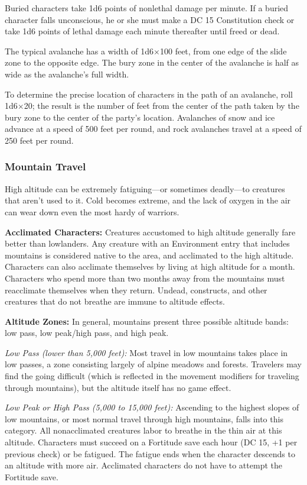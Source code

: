\documentclass{article}
\begin{document}
Buried characters take 1d6 points of nonlethal damage per minute. If a buried character 
falls unconscious, he or she must make a DC 15 Constitution check or take 1d6 points 
of lethal damage each minute thereafter until freed or dead.

The typical avalanche has a width of 1d6\ensuremath{\times}100 feet, from one edge 
of the slide zone to the opposite edge. The bury zone in the center of the avalanche 
is half as wide as the avalanche's full width.

To determine the precise location of characters in the path of an avalanche, roll 
1d6\ensuremath{\times}20; the result is the number of feet from the center of the 
path taken by the bury zone to the center of the party's location. Avalanches of 
snow and ice advance at a speed of 500 feet per round, and rock avalanches travel 
at a speed of 250 feet per round.

\subsubsection*{\textbf{Mountain Travel}}

High altitude can be extremely fatiguing---or sometimes deadly---to creatures that 
aren't used to it. Cold becomes extreme, and the lack of oxygen in the air can 
wear down even the most hardy of warriors.

\textbf{Acclimated Characters:} Creatures accustomed to high altitude generally 
fare better than lowlanders. Any creature with an Environment entry that includes 
mountains is considered native to the area, and acclimated to the high altitude. 
Characters can also acclimate themselves by living at high altitude for a month. 
Characters who spend more than two months away from the mountains must reacclimate 
themselves when they return. Undead, constructs, and other creatures that do not 
breathe are immune to altitude effects.

\textbf{Altitude Zones: }In general, mountains present three possible altitude 
bands: low pass, low peak/high pass, and high peak. 

\textit{Low Pass (lower than 5,000 feet): }Most travel in low mountains takes place 
in low passes, a zone consisting largely of alpine meadows and forests. Travelers 
may find the going difficult (which is reflected in the movement modifiers for 
traveling through mountains), but the altitude itself has no game effect.

\textit{Low Peak or High Pass (5,000 to 15,000 feet): }Ascending to the highest 
slopes of low mountains, or most normal travel through high mountains, falls into 
this category. All nonacclimated creatures labor to breathe in the thin air at 
this altitude. Characters must succeed on a Fortitude save each hour (DC 15, +1 
per previous check) or be fatigued. The fatigue ends when the character descends 
to an altitude with more air. Acclimated characters do not have to attempt the 
Fortitude save. 
\end{document}
